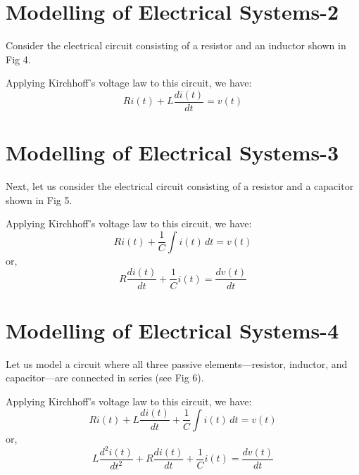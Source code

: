 \documentclass[../notes-main.tex]{subfiles}
\begin{document}

\section{Modelling of Electrical Systems-2}

Consider the electrical circuit consisting of a resistor and an inductor shown in Fig 4.


Applying Kirchhoff’s voltage law to this circuit, we have:
\[
R i(t) + L \frac{di(t)}{dt} = v(t)
\]

\section{Modelling of Electrical Systems-3}

Next, let us consider the electrical circuit consisting of a resistor and a capacitor shown in Fig 5.


Applying Kirchhoff’s voltage law to this circuit, we have:
\[
R i(t) + \frac{1}{C} \int i(t) \, dt = v(t)
\]
or,
\[
R \frac{di(t)}{dt} + \frac{1}{C} i(t) = \frac{dv(t)}{dt}
\]

\section{Modelling of Electrical Systems-4}

Let us model a circuit where all three passive elements—resistor, inductor, and capacitor—are connected in series (see Fig 6).


Applying Kirchhoff’s voltage law to this circuit, we have:
\[
R i(t) + L \frac{di(t)}{dt} + \frac{1}{C} \int i(t) \, dt = v(t)
\]
or,
\[
L \frac{d^2i(t)}{dt^2} + R \frac{di(t)}{dt} + \frac{1}{C} i(t) = \frac{dv(t)}{dt}
\]
\end{document}
